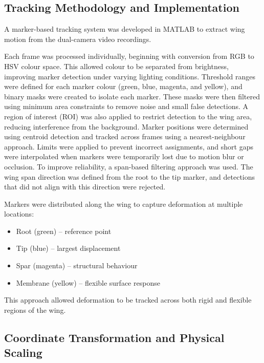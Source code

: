 \subsection{Tracking Methodology and Implementation}
 
A marker-based tracking system was developed in MATLAB to extract wing motion from the dual-camera video recordings.

Each frame was processed individually, beginning with conversion from RGB to HSV colour space. This allowed colour to be separated from brightness, improving marker detection under varying lighting conditions. Threshold ranges were defined for each marker colour (green, blue, magenta, and yellow), and binary masks were created to isolate each marker. These masks were then filtered using minimum area constraints to remove noise and small false detections. A region of interest (ROI) was also applied to restrict detection to the wing area, reducing interference from the background. Marker positions were determined using centroid detection and tracked across frames using a nearest-neighbour approach. Limits were applied to prevent incorrect assignments, and short gaps were interpolated when markers were temporarily lost due to motion blur or occlusion. To improve reliability, a span-based filtering approach was used. The wing span direction was defined from the root to the tip marker, and detections that did not align with this direction were rejected.
 
Markers were distributed along the wing to capture deformation at multiple locations:

\begin{itemize}

\item Root (green) – reference point

\item Tip (blue) – largest displacement

\item Spar (magenta) – structural behaviour

\item Membrane (yellow) – flexible surface response

\end{itemize}
 
This approach allowed deformation to be tracked across both rigid and flexible regions of the wing.
 
\subsection{Coordinate Transformation and Physical Scaling}
 
